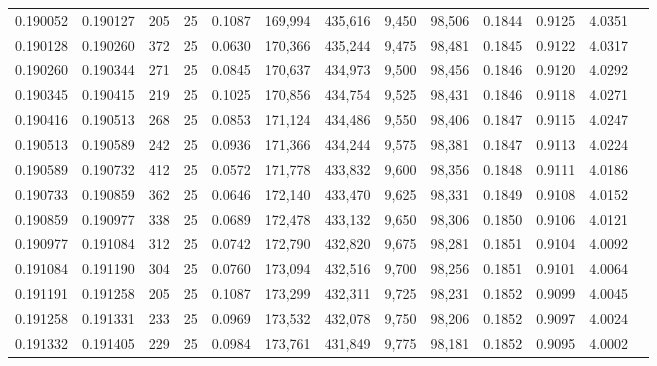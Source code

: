 \begin{tabular}{rrrrrrrrrrrrr}
0.190052 & 0.190127 &   205 &  25 &                                     0.1087 & 169,994 & 435,616 &   9,450 &  98,506 & 0.1844 & 0.9125 & 4.0351 \\
0.190128 & 0.190260 &   372 &  25 &                                     0.0630 & 170,366 & 435,244 &   9,475 &  98,481 & 0.1845 & 0.9122 & 4.0317 \\
0.190260 & 0.190344 &   271 &  25 &                                     0.0845 & 170,637 & 434,973 &   9,500 &  98,456 & 0.1846 & 0.9120 & 4.0292 \\
0.190345 & 0.190415 &   219 &  25 &                                     0.1025 & 170,856 & 434,754 &   9,525 &  98,431 & 0.1846 & 0.9118 & 4.0271 \\
0.190416 & 0.190513 &   268 &  25 &                                     0.0853 & 171,124 & 434,486 &   9,550 &  98,406 & 0.1847 & 0.9115 & 4.0247 \\
0.190513 & 0.190589 &   242 &  25 &                                     0.0936 & 171,366 & 434,244 &   9,575 &  98,381 & 0.1847 & 0.9113 & 4.0224 \\
0.190589 & 0.190732 &   412 &  25 &                                     0.0572 & 171,778 & 433,832 &   9,600 &  98,356 & 0.1848 & 0.9111 & 4.0186 \\
0.190733 & 0.190859 &   362 &  25 &                                     0.0646 & 172,140 & 433,470 &   9,625 &  98,331 & 0.1849 & 0.9108 & 4.0152 \\
0.190859 & 0.190977 &   338 &  25 &                                     0.0689 & 172,478 & 433,132 &   9,650 &  98,306 & 0.1850 & 0.9106 & 4.0121 \\
0.190977 & 0.191084 &   312 &  25 &                                     0.0742 & 172,790 & 432,820 &   9,675 &  98,281 & 0.1851 & 0.9104 & 4.0092 \\
0.191084 & 0.191190 &   304 &  25 &                                     0.0760 & 173,094 & 432,516 &   9,700 &  98,256 & 0.1851 & 0.9101 & 4.0064 \\
0.191191 & 0.191258 &   205 &  25 &                                     0.1087 & 173,299 & 432,311 &   9,725 &  98,231 & 0.1852 & 0.9099 & 4.0045 \\
0.191258 & 0.191331 &   233 &  25 &                                     0.0969 & 173,532 & 432,078 &   9,750 &  98,206 & 0.1852 & 0.9097 & 4.0024 \\
0.191332 & 0.191405 &   229 &  25 &                                     0.0984 & 173,761 & 431,849 &   9,775 &  98,181 & 0.1852 & 0.9095 & 4.0002 \\

\end{tabular}
